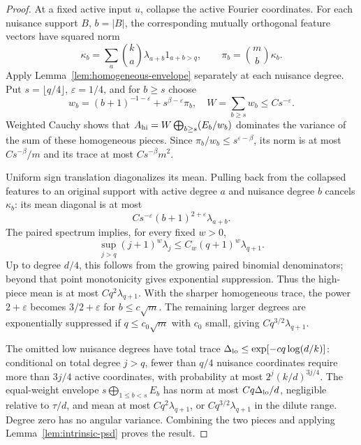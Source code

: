 \begin{proof}
At a fixed active input $u$, collapse the active Fourier coordinates.
For each nuisance support $B$, $b=|B|$, the corresponding mutually
orthogonal feature vectors have squared norm
\[
 \kappa_b=\sum_a\binom ka\lambda_{a+b}1_{a+b>q},
 \qquad \pi_b=\binom mb\kappa_b.
\]
Apply Lemma~\ref{lem:homogeneous-envelope} separately at each nuisance
degree. Put $s=\lfloor q/4\rfloor$, $\varepsilon=1/4$, and for
$b\ge s$ choose
\[
 w_b=(b+1)^{-1-\varepsilon}+s^{\beta-\varepsilon}\pi_b,
 \quad W=\sum_{b\ge s}w_b\le Cs^{-\varepsilon}.
\]
Weighted Cauchy shows that
$A_{\rm hi}=W\bigoplus_{b\ge s}(E_b/w_b)$ dominates the variance of
the sum of these homogeneous pieces. Since
$\pi_b/w_b\le s^{\varepsilon-\beta}$, its norm is at most
$Cs^{-\beta}/m$ and its trace at most $Cs^{-\beta}m^2$.

Uniform sign translation diagonalizes its mean. Pulling back from the
collapsed features to an original support with active degree $a$ and
nuisance degree $b$ cancels $\kappa_b$: its mean diagonal is at most
\[
 Cs^{-\varepsilon}(b+1)^{2+\varepsilon}\lambda_{a+b}.
\]
The paired spectrum implies, for every fixed $w>0$,
\[
 \sup_{j>q}(j+1)^w\lambda_j
     \le C_w(q+1)^w\lambda_{q+1}.
\]
Up to degree $d/4$, this follows from the growing paired binomial
denominators; beyond that point monotonicity gives exponential
suppression. Thus the high-piece mean is at most $Cq^2\lambda_{q+1}$.
With the sharper homogeneous trace, the power $2+\varepsilon$ becomes
$3/2+\varepsilon$ for $b\le c\sqrt m$. The remaining larger degrees
are exponentially suppressed if $q\le c_0\sqrt m$ with $c_0$ small,
giving $Cq^{3/2}\lambda_{q+1}$.

The omitted low nuisance degrees have total trace
$\Delta_{\rm lo}\le\exp[-cq\log(d/k)]$: conditional on total degree
$j>q$, fewer than $q/4$ nuisance coordinates require more than $3j/4$
active coordinates, with probability at most $2^j(k/d)^{3j/4}$.
The equal-weight envelope
$s\bigoplus_{1\le b<s}E_b$ has norm at most
$Cq\Delta_{\rm lo}/d$, negligible relative to $\tau/d$, and mean at
most $Cq^2\lambda_{q+1}$, or $Cq^{3/2}\lambda_{q+1}$ in the dilute
range. Degree zero has no angular variance. Combining the two pieces
and applying Lemma~\ref{lem:intrinsic-psd} proves the result.
\end{proof}


